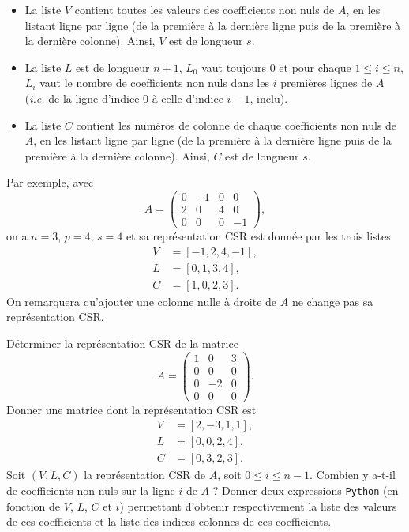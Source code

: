 \begin{itemize}
    \item La liste $V$ contient toutes les valeurs des coefficients non nuls de $A$, en les listant ligne par ligne (de la première à la dernière ligne puis de la première à la dernière colonne). Ainsi, $V$ est de longueur $s$. 
    \item La liste $L$ est de longueur $n+1$, $L_0$ vaut toujours $0$ et pour chaque $1\leq i \leq n$, $L_i$ vaut le nombre de coefficients non nuls dans les $i$ premières lignes de $A$ (\emph{i.e.} de la ligne d'indice $0$ à celle d'indice $i-1$, inclu). 
    \item La liste $C$ contient les numéros de colonne de chaque coefficients non nuls de $A$, en les listant ligne par ligne (de la première à la dernière ligne puis de la première à la dernière colonne). Ainsi, $C$ est de longueur $s$.
\end{itemize}
Par exemple, avec
\begin{equation*}
    A = \begin{pmatrix} 0 & -1 & 0 & 0 \\ 2 & 0 & 4 & 0 \\ 0 & 0 & 0 & -1  \end{pmatrix},
\end{equation*}
on a $n = 3$, $p = 4$, $s = 4$ et sa représentation CSR est donnée par les trois listes 
\begin{align*}
    V &= [-1,2,4,-1], \\
    L &= [0,1,3,4], \\
    C &= [1,0,2,3].
\end{align*}
On remarquera qu'ajouter une colonne nulle à droite de $A$ ne change pas sa représentation CSR. 

\bigskip{}

\question{} Déterminer la représentation CSR de la matrice 
\begin{equation*}
    A = \begin{pmatrix} 1 & 0 & 3 \\ 0 & 0 & 0 \\ 0 & -2 & 0 \\ 0 & 0 & 0 \end{pmatrix}.
\end{equation*}
\question{} Donner une matrice dont la représentation CSR est 
\begin{align*}
    V &= [2,-3,1,1], \\
    L &= [0,0,2,4], \\
    C &= [0,3,2,3].
\end{align*}
\question{} Soit $(V,L,C)$ la représentation CSR de $A$, soit $0 \leq i \leq n-1$. Combien y a-t-il de coefficients non nuls sur la ligne \no$i$ de $A$ ? Donner deux expressions \texttt{Python}{} (en fonction de $V$, $L$, $C$ et $i$) permettant d'obtenir respectivement la liste des valeurs de ces coefficients et la liste des indices colonnes de ces coefficients. 

